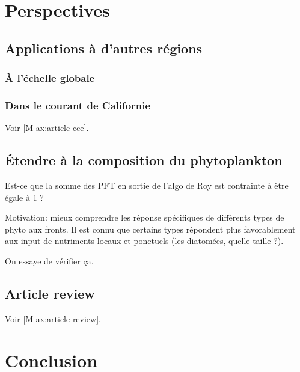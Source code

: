 \documentclass[index]{subfiles}
\begin{document}
\chapter{Perspectives}
\label{chp:perspectives}

\tocsubfile

\section{Applications à d'autres régions}
\label{sec:appl-autres-regions}

\subsection{À l'échelle globale}
\label{sec:global}

\subsection{Dans le courant de Californie}
\label{sec:CCE}

Voir \cref{M-ax:article-cce}.

\section{Étendre à la composition du phytoplankton}
\label{sec:persp-pft}

Est-ce que la somme des PFT en sortie de l'algo de Roy est contrainte à être égale à 1 ?

Motivation: mieux comprendre les réponse spécifiques de différents types de phyto aux fronts.
Il est connu que certains types répondent plus favorablement aux input de nutriments locaux et ponctuels (les diatomées, quelle taille ?).

On essaye de vérifier ça.

\section{Article review}
Voir \cref{M-ax:article-review}.

\chapter{Conclusion}
\label{chp:conclusion}
\end{document}
